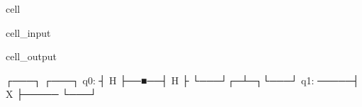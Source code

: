 \documentclass[letterpaper,10pt,english]{jupyterBook}
\begin{document}
\begin{sphinxuseclass}{cell}\begin{sphinxVerbatimInput}

\begin{sphinxuseclass}{cell_input}
\begin{sphinxVerbatim}[commandchars=\\\{\}]
   



\end{sphinxVerbatim}

\end{sphinxuseclass}\end{sphinxVerbatimInput}
\begin{sphinxVerbatimOutput}

\begin{sphinxuseclass}{cell_output}
\begin{sphinxVerbatim}[commandchars=\\\{\}]
     ┌───┐     ┌───┐
q\PYGZus{}0: ┤ H ├──■──┤ H ├
     └───┘┌─┴─┐└───┘
q\PYGZus{}1: ─────┤ X ├─────
          └───┘
\end{sphinxVerbatim}

\end{sphinxuseclass}\end{sphinxVerbatimOutput}

\end{sphinxuseclass}
\end{document}
